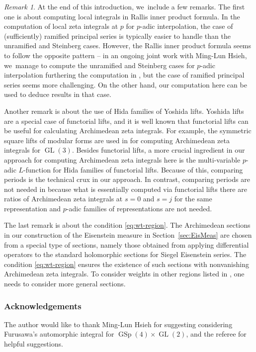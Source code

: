 \documentclass[JEP,XML,SOM,Unicode,published]{cedram}
\newcommand{\Lfunction}{$L$\nobreakdash-func\-tion\xspace}
\theoremstyle{plain}
\theoremstyle{remark}
\newtheorem{rmkintro}[thmintro]{Remark}
\DeclareMathOperator{\GL}{GL}
\DeclareMathOperator{\GSp}{GSp}
\begin{document}
\begin{rmkintro}
At the end of this introduction, we~include a few remarks. The first one is about computing local integrals in Rallis inner product formula. In the computation of local zeta integrals at $p$ for $p$-adic interpolation, the case of (sufficiently) ramified principal series is typically easier to handle than the unramified and Steinberg cases. However, the Rallis inner product formula seems to follow the opposite pattern -- in an ongoing joint work with Ming-Lun Hsieh, we~manage to compute the unramified and Steinberg cases for $p$-adic interpolation furthering the computation in \cite{HsiehNamiInner}, but the case of ramified principal series seems more challenging. On the other hand, our computation here can be used to deduce results in that case.

Another remark is about the use of Hida families of Yoshida lifts. Yoshida lifts are a special case of functorial lifts, and it is well known that functorial lifts can be useful for calculating Archimedean zeta integrals. For example, the symmetric square lifts of modular forms are used in \cite{LoWi-GL3} for computing Archimedean zeta integrals for $\GL(3)$. Besides functorial lifts, a more crucial ingredient in our approach for computing Archimedean zeta integrals here is the multi-variable $p$-adic \Lfunction for Hida families of functorial lifts. Because of this, comparing periods is the technical crux in our approach. In contrast, comparing periods are not needed in \loccit because what is essentially computed via functorial lifts there are ratios of Archimedean zeta integrals at $s=0$ and $s=j$ for the same representation and $p$-adic families of representations are not needed.

The last remark is about the condition \eqref{eq:wt-region}. The Archimedean sections in our construction of the Eisenstein measure in Section~\ref{sec:EisMeas} are chosen from a special type of sections, namely those obtained from applying differential operators to the standard holomorphic sections for Siegel Eisenstein series. The condition \eqref{eq:wt-region} ensures the existence of such sections with nonvanishing Archimedean zeta integrals. To consider weights in other regions listed in \cite{LoRi}, one needs to consider more general sections.
\end{rmkintro}

\subsubsection*{Acknowledgements} The author would like to thank Ming-Lun Hsieh for suggesting considering Furusawa's automorphic integral for $\GSp(4)\times\GL(2)$, and the referee for helpful suggestions.
\end{document}
